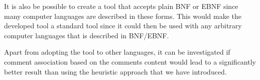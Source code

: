 It is also be possible to create a tool that accepts plain \ac{BNF} or \ac{EBNF} since many computer languages are described in these forms. This would make the developed tool a standard tool since it could then be used with any arbitrary computer languages that is described in \ac{BNF}/\ac{EBNF}.

Apart from adopting the tool to other languages, it can be investigated if comment association based on the comments content would lead to a significantly better result than using the heuristic approach that we have introduced.
